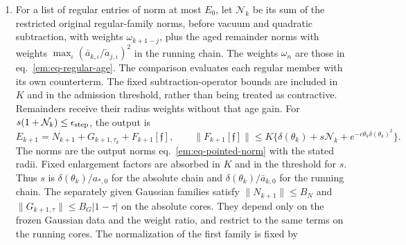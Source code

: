 \documentclass[11pt,letterpaper,reqno]{amsart}
\numberwithin{equation}{section}
\renewcommand{\eqref}[1]{\textup{eq.~\ref{#1}}}
\theoremstyle{definition}
\theoremstyle{remark}
\begin{document}
\begin{enumerate}
  backgrounds used by the actual step also have to lie in their own
  covariance classes throughout the retained real cut. The creation
  radius is $c_e\varepsilon(\theta_k)$
  at step $k\to k+1$, where $\varepsilon$ is the supplied real curvature
  threshold and $c_e$ is fixed by the domain margin. At every formed
  level, the supplied background, pair core and companion satisfy
  the domain, response, summability and cofinal compatibility
  hypotheses of
  \cref{em:lem-physical-radius,em:prop-physical-polarization,em:prop-companion-coefficient}
  uniformly on the output domains. The actual gauge and pointing
  identities supply the symmetry hypotheses as explained below.
  The readout results then define the new scalar coefficient
  before this output is used in a later list. Their analytic
  bounds use the supplied background and family estimates,
  independently of the present iteration.
\item For a list of regular entries of norm at most $E_0$, let $\mathcal
  N_k$ be its sum of the restricted original regular-family norms,
  before vacuum and quadratic subtraction, with weights
  $\omega_{k+1-j}$, plus the aged remainder norms with weights
  $\max_\iota(\bar a_{k,\iota}/\check a_{j,\iota})^2$ in the running
  chain. The weights $\omega_n$ are those in \eqref{em:eq-regular-age}.
  The comparison evaluates each regular member with its own
  counterterm. The fixed subtraction-operator bounds are included
  in $K$ and in the admission threshold, rather than being treated
  as contractive. Remainders receive their radius weights without
  that age gain.
  For $s(1+\mathcal N_k)\le\epsilon_{\rm step}$, the output is
  \begin{equation}\label{em:eq-rs-formation}
    E_{k+1}=N_{k+1}+G_{k+1,\tau_k}+F_{k+1}[\mathfrak f],\qquad
    \|F_{k+1}[\mathfrak f]\|\le
        K\{\delta(\theta_k)+s\mathcal N_k
                    +e^{-c\theta_k\delta(\theta_k)^2}\} .
  \end{equation}
  The norms are the output norms \eqref{em:eq-pointed-norm} with the
  stated radii. Fixed enlargement factors are absorbed in $K$ and in
  the threshold for $s$. Thus $s$ is $\delta(\theta_k)/a_{*,0}$ for
  the absolute chain and $\delta(\theta_k)/\bar a_{k,0}$ for the
  running chain. The separately given Gaussian families satisfy
  $\|N_{k+1}\|\le B_N$ and $\|G_{k+1,\tau}\|\le B_G|1-\tau|$ on the
  absolute cores. They depend only on the frozen Gaussian data and
  the weight ratio, and restrict to the same terms on the running
  cores. The normalization of the first family is fixed by

\end{enumerate}
\end{document}
